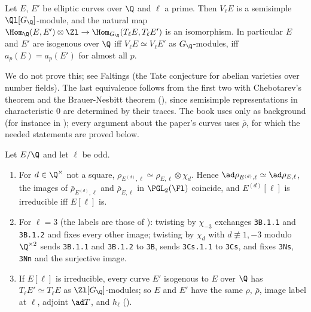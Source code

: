 \begin{theorem}[Faltings]\label{thm:galrep:faltings}
Let $E$, $E'$ be elliptic curves over $\Q$ and $\ell$ a prime. Then $V_\ell E$ is a semisimple $\Ql[G_\Q]$-module, and the natural map
$\Hom_\Q(E,E')\otimes\Zl\to\Hom_{G_\Q}(T_\ell E,T_\ell E')$ is an isomorphism. In particular $E$ and $E'$ are isogenous over $\Q$ iff $V_\ell E\simeq V_\ell E'$ as
$G_\Q$-modules, iff $a_p(E)=a_p(E')$ for almost all $p$.
\end{theorem}

We do not prove this; see Faltings \cite{Faltings83} (the Tate conjecture for abelian varieties over number fields). The last equivalence
follows from the first two with Chebotarev's theorem and the Brauer-Nesbitt theorem (), since semisimple representations
in characteristic $0$ are determined by their traces. The book uses  only as background (for instance in
); every argument about the paper's curves uses $\bar\rho$, for which the needed statements are proved below.

\begin{proposition}\label{prop:galrep:twist-isogeny}
Let $E/\Q$ and let $\ell$ be odd.
\begin{enumerate}[label=(\roman*)]
\item For $d\in\Q^\times$ not a square, $\rho_{E^{(d)},\ell}\simeq\rho_{E,\ell}\otimes\chi_d$. Hence $\ad\rho_{E^{(d)},\ell}\simeq\ad\rho_{E,\ell}$, the images of
$\bar\rho_{E^{(d)},\ell}$ and $\bar\rho_{E,\ell}$ in $\PGL_2(\Fl)$ coincide, and $E^{(d)}[\ell]$ is irreducible iff $E[\ell]$ is.
\item For $\ell=3$ (the labels are those of ): twisting by $\chi_{-3}$ exchanges \texttt{3B.1.1} and \texttt{3B.1.2}
and fixes every other image; twisting by $\chi_d$ with $d\not\equiv1,-3$ modulo $\Q^{\times2}$ sends \texttt{3B.1.1} and \texttt{3B.1.2} to
\texttt{3B}, sends \texttt{3Cs.1.1} to \texttt{3Cs}, and fixes \texttt{3Ns}, \texttt{3Nn} and the surjective image.
\item If $E[\ell]$ is irreducible, every curve $E'$ isogenous to $E$ over $\Q$ has $T_\ell E'\simeq T_\ell E$ as $\Zl[G_\Q]$-modules; so $E$ and $E'$ have
the same $\rho$, $\bar\rho$, image label at $\ell$, adjoint $\ad T$, and $h_\ell$ ().
\end{enumerate}
\end{proposition}


